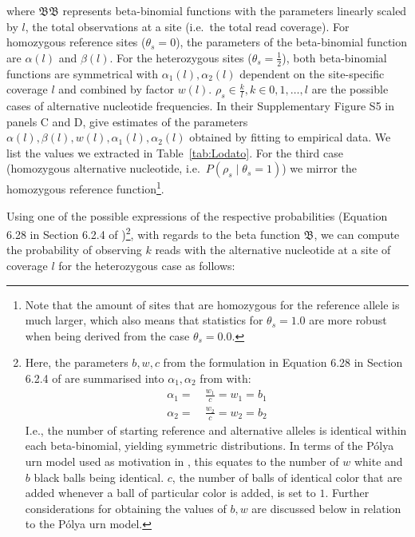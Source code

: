 \documentclass[authoryear,preprint,11pt]{scrartcl}
\newcommand{\Prob}{{P}}
\newcommand{\cB}{{\mathfrak B}}
\begin{document}
where $\cB\cB$ represents beta-binomial functions with the parameters linearly scaled by $l$, the total observations at a site (i.e.~the total read coverage).
For homozygous reference sites ($\theta_s = 0$), the parameters of the beta-binomial function are $\alpha(l)$ and $\beta(l)$.
For the heterozygous sites ($\theta_s = \frac12$), both beta-binomial functions are symmetrical with $\alpha_1(l),\alpha_2(l)$ dependent on the site-specific coverage $l$ and combined by factor $w(l)$.
$\rho_s \in \frac{k}{l}, k \in {0, 1, \dots, l}$ are the possible cases of alternative nucleotide frequencies.
In their Supplementary Figure S5 in panels C and D, \cite{lodato_somatic_2015} give estimates of the parameters $\alpha(l), \beta(l), w(l), \alpha_1(l), \alpha_2(l)$ obtained by fitting to empirical data.
We list the values we extracted in Table~\ref{tab:Lodato}.
For the third case (homozygous alternative nucleotide, i.e.~$\Prob(\rho_s \mid \theta_s = 1)$) we mirror the homozygous reference function\footnote{
Note that the amount of sites that are homozygous for the reference allele is much larger, which also means that statistics for $\theta_s=1.0$ are more robust when being derived from the case $\theta_s=0.0$.
}.

Using one of the possible expressions of the respective probabilities (Equation 6.28 in Section 6.2.4 of \cite{johnson_univariate_2005})\footnote{
 Here, the parameters $b,w,c$ from the formulation in Equation 6.28 in Section 6.2.4 of \cite{johnson_univariate_2005} are summarised into $\alpha_1,\alpha_2$ from \cite{lodato_somatic_2015} with:
 \begin{equation}
 \label{eq.johnson_relation}
 \begin{split}
  \alpha_1 =~ & \frac{w_1}{c} = w_1 = b_1\\
  \alpha_2 =~ & \frac{w_2}{c} = w_2 = b_2
 \end{split}
 \end{equation}
 I.e., the number of starting reference and alternative alleles is identical within each beta-binomial, yielding symmetric distributions.
 In terms of the Pólya urn model used as motivation in \cite{johnson_univariate_2005}, this equates to the number of $w$ white and $b$ black balls being identical.
 $c$, the number of balls of identical color that are added whenever a ball of particular color is added, is set to $1$.
 Further considerations for obtaining the values of $b,w$ are discussed below in relation to the Pólya urn model.
}, with regards to the beta function $\mathfrak{B}$, we can compute the probability of observing $k$ reads with the alternative nucleotide at a site of coverage $l$ for the heterozygous case as follows:
\end{document}
